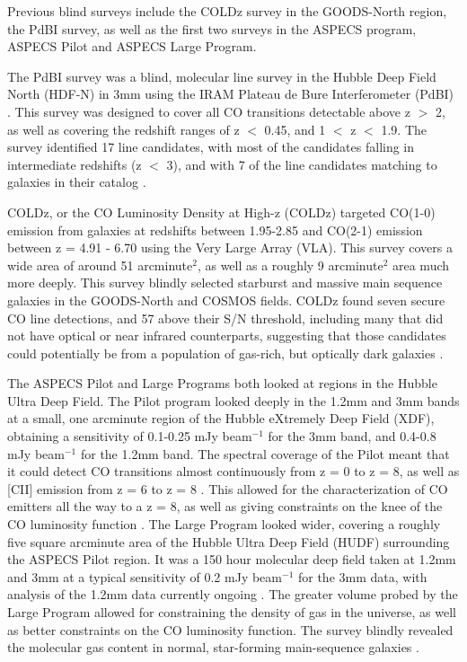 \documentclass[twoside,single]{lion-msc}
\begin{document}
Previous blind surveys include the COLDz survey in the GOODS-North region, the PdBI survey, as well as the first two surveys in the ASPECS program, ASPECS Pilot and ASPECS Large Program.

The PdBI survey was a blind, molecular line survey in the Hubble Deep Field North (HDF-N) in 3mm using the IRAM Plateau de Bure Interferometer (PdBI) \cite{decarli2014molecular}. This survey was designed to cover all CO transitions detectable above z $>$ 2, as well as covering the redshift ranges of z $<$ 0.45, and 1 $<$ z $<$ 1.9. The survey identified 17 line candidates, with most of the candidates falling in intermediate redshifts (z $<$ 3), and with 7 of the line candidates matching to galaxies in their catalog \cite{decarli2014molecular}.

COLDz, or the CO Luminosity Density at High-z (COLDz) targeted CO(1-0) emission from galaxies at redshifts between 1.95-2.85 and CO(2-1) emission between z = 4.91 - 6.70 using the Very Large Array (VLA)\cite{pavesi2018co}. This survey covers a wide area of around 51 arcminute$^2$, as well as a roughly 9 arcminute$^2$ area much more deeply. This survey blindly selected starburst and massive main sequence galaxies in the GOODS-North and COSMOS fields. COLDz found seven secure CO line detections, and 57 above their S/N threshold, including many that did not have optical or near infrared counterparts, suggesting that those candidates could potentially be from a population of gas-rich, but optically dark galaxies \cite{pavesi2018co}.

The ASPECS Pilot and Large Programs both looked at regions in the Hubble Ultra Deep Field. The Pilot program looked deeply in the 1.2mm and 3mm bands at a small, one arcminute region of the Hubble eXtremely Deep Field (XDF), obtaining a sensitivity of 0.1-0.25 mJy beam$^{-1}$ for the 3mm band, and 0.4-0.8 mJy beam$^{-1}$ for the 1.2mm band. The spectral coverage of the Pilot meant that it could detect CO transitions almost continuously from z = 0 to z = 8, as well as [CII] emission from z = 6 to z = 8 \cite{walter2016alma}. This allowed for the characterization of CO emitters all the way to a z = 8, as well as giving constraints on the knee of the CO luminosity function \cite{walter2016alma}. 
The Large Program looked wider, covering a roughly five square arcminute area of the Hubble Ultra Deep Field (HUDF) surrounding the ASPECS Pilot region. It was a 150 hour molecular deep field taken at 1.2mm and 3mm at a typical sensitivity of 0.2 mJy beam$^{-1}$ for the 3mm data, with analysis of the 1.2mm data currently ongoing \cite{decarli2019alma}. The greater volume probed by the Large Program allowed for constraining the density of gas in the universe, as well as better constraints on the CO luminosity function. The survey blindly revealed the molecular gas content in normal, star-forming main-sequence galaxies \cite{decarli2019alma}. 
\end{document}
